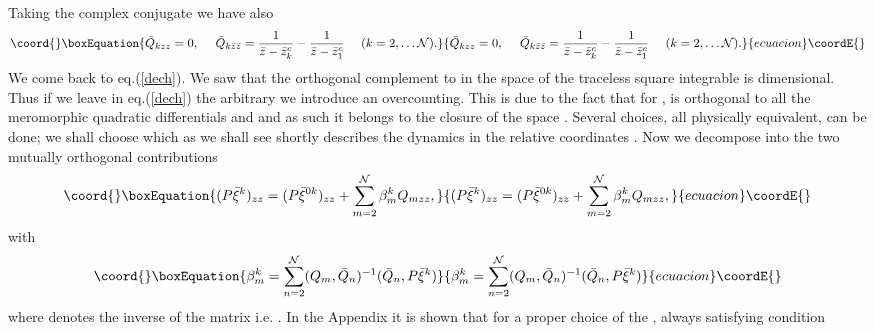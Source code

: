 \documentclass[a4paper,12pt]{article}
\begin{document}
Taking the complex conjugate we have also
\begin{equation}\coord{}\boxEquation{\label{Qbase2}
\bar Q_{kzz}=0,~~~~\bar Q_{k\bar z \bar z}=\frac{1}{\bar z-\bar
z^c_k}-\frac{1}{\bar z-\bar z^c_1}~~~~(k=2,\dots {\cal N}).
}{\bar Q_{kzz}=0,~~~~\bar Q_{k\bar z \bar z}=\frac{1}{\bar z-\bar
z^c_k}-\frac{1}{\bar z-\bar z^c_1}~~~~(k=2,\dots {\cal N}).
}{ecuacion}\coordE{}\end{equation}
We come back to eq.(\ref{dech}). We saw that the orthogonal complement
to \coordHE{} in the space of the traceless square integrable \coordHE{} is \coordHE{} dimensional. Thus if we leave in
eq.(\ref{dech}) the \coordHE{} arbitrary we introduce an overcounting.
This is due to the fact that for \coordHE{}, \coordHE{} is 
orthogonal to all 
the meromorphic 
quadratic differentials \coordHE{} and \coordHE{} and as such it belongs to
the closure of 
the space \coordHE{}. Several choices, all
physically equivalent, can 
be done; we shall choose 
\coordHE{} which as we shall see shortly describes the dynamics in
the relative coordinates \coordHE{}.  
Now we decompose \coordHE{} into the two mutually orthogonal
contributions
\begin{equation}\coord{}\boxEquation{\label{decomposition}
(P\bar\xi^{k})_{zz} = (P\bar\xi^{0k})_{zz}+\sum_{m=2}^{\cal
N}\beta^k_m Q_{mzz},   
}{(P\bar\xi^{k})_{zz} = (P\bar\xi^{0k})_{zz}+\sum_{m=2}^{\cal
N}\beta^k_m Q_{mzz},   
}{ecuacion}\coordE{}\end{equation}
with
\begin{equation}\coord{}\boxEquation{
\beta^k_m=\sum_{n=2}^{\cal N}(Q_m,\bar Q_n)^{-1}(\bar Q_n, P\bar\xi^{k})
}{
\beta^k_m=\sum_{n=2}^{\cal N}(Q_m,\bar Q_n)^{-1}(\bar Q_n, P\bar\xi^{k})
}{ecuacion}\coordE{}\end{equation}
where \coordHE{} denotes the inverse of the \coordHE{} matrix \coordHE{} i.e. \coordHE{} .  In the Appendix it is shown
that for a proper choice of the \coordHE{}, always satisfying condition
\end{document}
